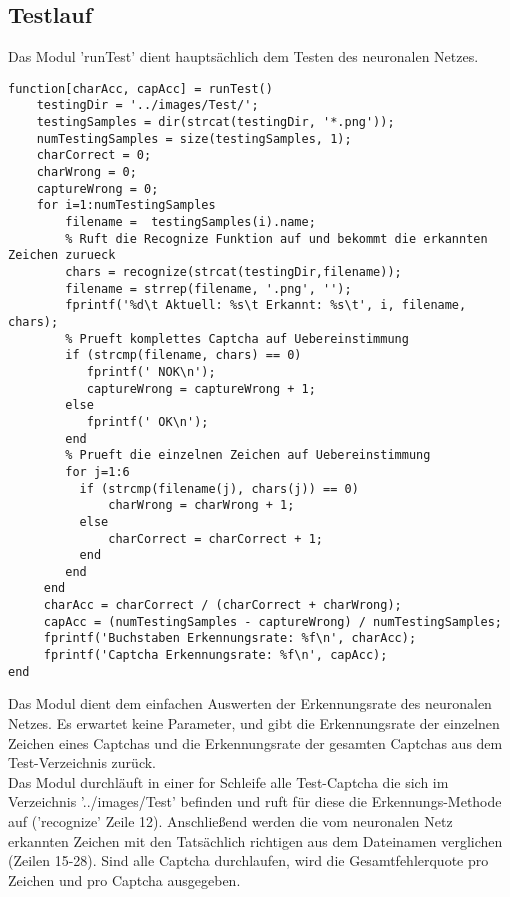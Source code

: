 \subsection{Testlauf}
Das Modul 'runTest' dient hauptsächlich dem Testen des neuronalen Netzes. 
\begin{lstlisting}
function[charAcc, capAcc] = runTest()
    testingDir = '../images/Test/';    
    testingSamples = dir(strcat(testingDir, '*.png'));
    numTestingSamples = size(testingSamples, 1);
    charCorrect = 0;
    charWrong = 0;
    captureWrong = 0;
    for i=1:numTestingSamples
        filename =  testingSamples(i).name;
        % Ruft die Recognize Funktion auf und bekommt die erkannten Zeichen zurueck
        chars = recognize(strcat(testingDir,filename));
        filename = strrep(filename, '.png', '');
        fprintf('%d\t Aktuell: %s\t Erkannt: %s\t', i, filename, chars);
        % Prueft komplettes Captcha auf Uebereinstimmung
        if (strcmp(filename, chars) == 0)
           fprintf(' NOK\n');
           captureWrong = captureWrong + 1;
        else
           fprintf(' OK\n');
        end
        % Prueft die einzelnen Zeichen auf Uebereinstimmung
        for j=1:6
          if (strcmp(filename(j), chars(j)) == 0) 
              charWrong = charWrong + 1;
          else
              charCorrect = charCorrect + 1;
          end
        end   
     end
     charAcc = charCorrect / (charCorrect + charWrong);
     capAcc = (numTestingSamples - captureWrong) / numTestingSamples;
     fprintf('Buchstaben Erkennungsrate: %f\n', charAcc);
     fprintf('Captcha Erkennungsrate: %f\n', capAcc);
end
\end{lstlisting}
Das Modul dient dem einfachen Auswerten der Erkennungsrate des neuronalen Netzes. Es erwartet keine Parameter, und gibt die Erkennungsrate der einzelnen Zeichen eines Captchas und die Erkennungsrate der gesamten Captchas aus dem Test-Verzeichnis zurück.\\
Das Modul durchläuft in einer for Schleife alle Test-Captcha die sich im Verzeichnis '../images/Test' befinden und ruft für diese die Erkennungs-Methode auf ('recognize' Zeile 12). Anschließend werden die vom neuronalen Netz erkannten Zeichen mit den Tatsächlich richtigen aus dem Dateinamen verglichen (Zeilen 15-28). Sind alle Captcha durchlaufen, wird die Gesamtfehlerquote pro Zeichen und pro Captcha ausgegeben.